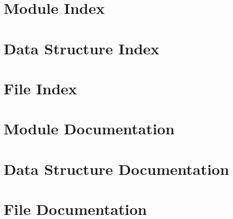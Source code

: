 \documentclass[twoside]{book}
\newcommand{\+}{\discretionary{\mbox{\scriptsize$\hookleftarrow$}}{}{}}
\newcommand{\clearemptydoublepage}{%
  \newpage{\pagestyle{empty}\cleardoublepage}%
}
\begin{document}
\chapter{Module Index}

\chapter{Data Structure Index}

\chapter{File Index}

\chapter{Module Documentation}





\chapter{Data Structure Documentation}








\chapter{File Documentation}



\backmatter
\newpage
{}
\clearemptydoublepage
{}
\printindex
\end{document}
